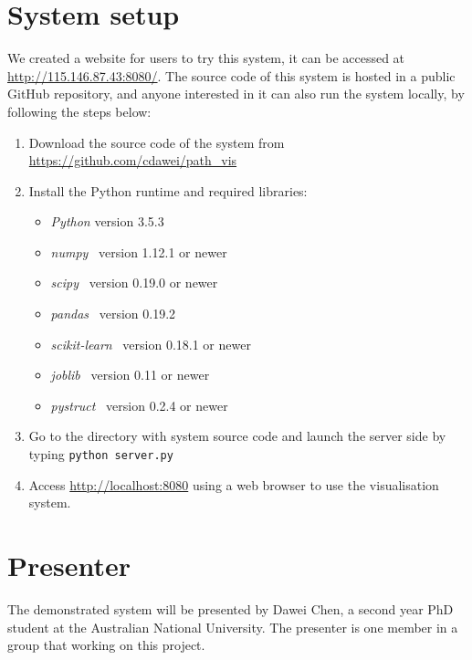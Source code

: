 \documentclass[sigconf]{acmart}
\begin{document}
\section{System setup}
\label{sec:setup}
We created a website for users to try this system, it can be accessed at \url{http://115.146.87.43:8080/}.
The source code of this system is hosted in a public GitHub repository, 
and anyone interested in it can also run the system locally, by following the steps below:
\begin{enumerate}
\item Download the source code of the system from \url{https://github.com/cdawei/path_vis} 
\item Install the Python runtime and required libraries: 
      \begin{itemize}
      \item \textit{Python} version 3.5.3
      \item \textit{numpy}~\cite{numpy} version 1.12.1 or newer
      \item \textit{scipy}~\cite{scipy} version 0.19.0 or newer
      \item \textit{pandas}~\cite{pandas} version 0.19.2
      \item \textit{scikit-learn}~\cite{sklearn} version 0.18.1 or newer
      \item \textit{joblib}~\cite{joblib} version 0.11 or newer
      \item \textit{pystruct}~\cite{JMLR:v15:mueller14a} version 0.2.4 or newer
      \end{itemize}
\item Go to the directory with system source code and launch the server side by typing \texttt{python server.py}
\item Access \url{http://localhost:8080} using a web browser to use the visualisation system.
\end{enumerate}


\section{Presenter}
\label{sec:presenter}
The demonstrated system will be presented by Dawei Chen, a second year PhD student at the Australian National University.
The presenter is one member in a group that working on this project.



 
\end{document}
